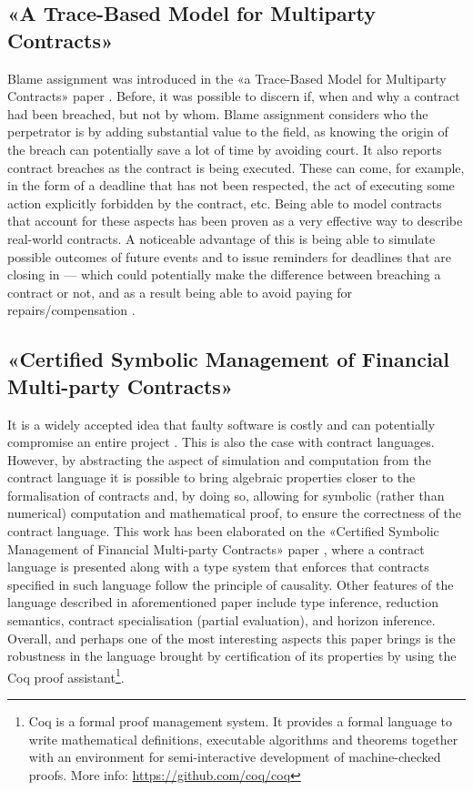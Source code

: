 \documentclass{ituthesis}
\begin{document}
\subsection{«A Trace-Based Model for Multiparty Contracts»}
Blame assignment was introduced in the «a Trace-Based Model for Multiparty Contracts» paper \cite{hvitved2012trace}. Before, it was possible to discern if, when and why a contract had been breached, but not by whom. Blame assignment considers who the perpetrator is by adding substantial value to the field, as knowing the origin of the breach can potentially save a lot of time by avoiding court. It also reports contract breaches as the contract is being executed. These can come, for example, in the form of a deadline that has not been respected, the act of executing some action explicitly forbidden by the contract, etc. Being able to model contracts that account for these aspects has been proven as a very effective way to describe real-world contracts. A noticeable advantage of this is being able to simulate possible outcomes of future events and to issue reminders for deadlines that are closing in --- which could potentially make the difference between breaching a contract or not, and as a result being able to avoid paying for repairs/compensation \cite{hvitved2012trace}.

\subsection{«Certified Symbolic Management of Financial Multi-party Contracts»}
It is a widely accepted idea that faulty software is costly and can potentially compromise an entire project \cite{expensivesoftware}. This is also the case with contract languages. However, by abstracting the aspect of simulation and computation from the contract language it is possible to bring algebraic properties closer to the formalisation of contracts and, by doing so, allowing for symbolic (rather than numerical) computation and mathematical proof, to ensure the correctness of the contract language. This work has been elaborated on the «Certified Symbolic Management of Financial Multi-party Contracts» paper \cite{bahr2015certified}, where a contract language is presented along with a type system that enforces that contracts specified in such language follow the principle of causality. Other features of the language described in aforementioned paper include type inference, reduction semantics, contract specialisation (partial evaluation), and horizon inference. Overall, and perhaps one of the most interesting aspects this paper brings is the robustness in the language brought by certification of its properties by using the Coq proof
assistant\footnote{Coq is a formal proof management system. It provides a formal language to write mathematical definitions, executable algorithms and theorems together with an environment for semi-interactive development of machine-checked proofs. More info: \url{https://github.com/coq/coq}}.
\end{document}
